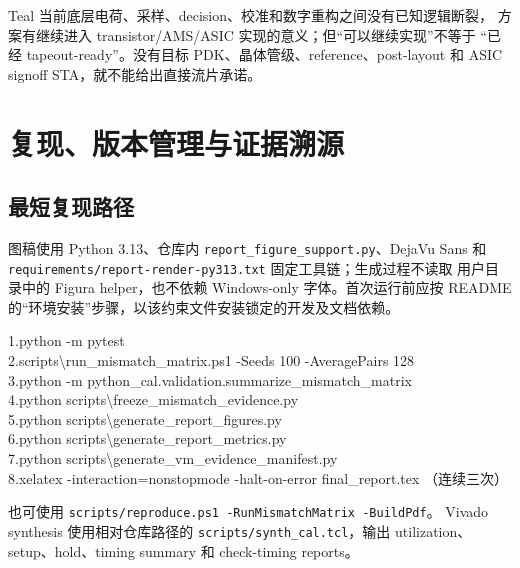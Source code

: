 \documentclass[UTF8,11pt,a4paper]{ctexart}
\newcommand{\code}[1]{\texttt{\small #1}}
\newcommand{\pathcode}[1]{{\small\nolinkurl{#1}}}
\begin{document}
\begin{verdictbox}[title=\textbf{“逻辑能否流片”的准确回答}]{Teal}
  当前底层电荷、采样、decision、校准和数字重构之间没有已知逻辑断裂，
  方案有继续进入 transistor/AMS/ASIC 实现的意义；但“可以继续实现”不等于
  “已经 tapeout-ready”。没有目标 PDK、晶体管级、reference、post-layout
  和 ASIC signoff STA，就不能给出直接流片承诺。
\end{verdictbox}

\section[复现与证据溯源]{复现、版本管理与证据溯源}

\subsection{最短复现路径}

图稿使用 Python 3.13、仓库内 \code{report\_figure\_support.py}、DejaVu Sans
和 \pathcode{requirements/report-render-py313.txt} 固定工具链；生成过程不读取
用户目录中的 Figura helper，也不依赖 Windows-only 字体。首次运行前应按
README 的“环境安装”步骤，以该约束文件安装锁定的开发及文档依赖。

\begin{notebox}
  \ttfamily\small
  1.\quad python -m pytest\\[1mm]
  2.\quad scripts\textbackslash run\_mismatch\_matrix.ps1
    -Seeds 100 -AveragePairs 128\\[1mm]
  3.\quad python -m python\_cal.validation.summarize\_mismatch\_matrix\\[1mm]
  4.\quad python scripts\textbackslash freeze\_mismatch\_evidence.py\\[1mm]
  5.\quad python scripts\textbackslash generate\_report\_figures.py\\[1mm]
  6.\quad python scripts\textbackslash generate\_report\_metrics.py\\[1mm]
  7.\quad python scripts\textbackslash generate\_vm\_evidence\_manifest.py\\[1mm]
  8.\quad xelatex -interaction=nonstopmode -halt-on-error final\_report.tex
    \quad（连续三次）
\end{notebox}

也可使用 \code{scripts/reproduce.ps1 -RunMismatchMatrix -BuildPdf}。
Vivado synthesis 使用相对仓库路径的 \code{scripts/synth\_cal.tcl}，输出
utilization、setup、hold、timing summary 和 check-timing reports。
\end{document}
